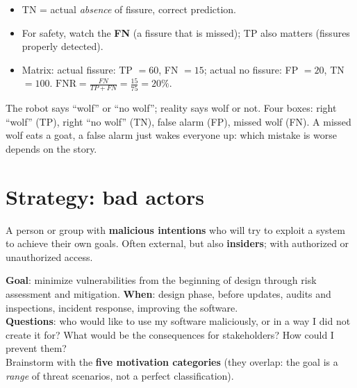 \documentclass[11pt,a4paper,openany]{book}
\begin{document}
\begin{exbox}[title={Exam-type questions: fissures in concrete (positive = fissure)}]
\begin{itemize}
  \item TN = actual \emph{absence} of fissure, correct prediction.
  \item For safety, watch the \textbf{FN} (a fissure that is missed); TP also matters (fissures
        properly detected).
  \item Matrix: actual fissure: TP $=60$, FN $=15$; actual no fissure: FP $=20$, TN $=100$.
        $\text{FNR} = \frac{FN}{TP+FN} = \frac{15}{75} = 20\%$.
\end{itemize}
\end{exbox}

\begin{goatbox}
The robot says ``wolf'' or ``no wolf''; reality says wolf or not. Four boxes: right ``wolf''
(TP), right ``no wolf'' (TN), false alarm (FP), missed wolf (FN). A missed wolf eats a goat, a
false alarm just wakes everyone up: which mistake is worse depends on the story.
\end{goatbox}


\section{Strategy: bad actors}

\begin{defnbox}[title={Bad actor (threat actor)}]
A person or group with \textbf{malicious intentions} who will try to exploit a system to achieve
their own goals. Often external, but also \textbf{insiders}; with authorized or unauthorized
access.
\end{defnbox}

\begin{algbox}[title={Applying the strategy (cheat sheet 1.6)}]
\textbf{Goal}: minimize vulnerabilities from the beginning of design through risk assessment
and mitigation. \textbf{When}: design phase, before updates, audits and inspections, incident
response, improving the software. \\
\textbf{Questions}: who would like to use my software maliciously, or in a way I did not create
it for? What would be the consequences for stakeholders? How could I prevent them? \\
Brainstorm with the \textbf{five motivation categories} (they overlap: the goal is a
\emph{range} of threat scenarios, not a perfect classification).
\end{algbox}
\end{document}
